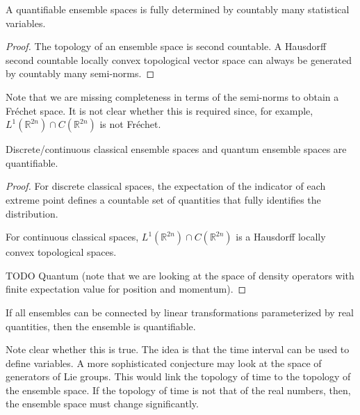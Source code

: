 \begin{coro}
	A quantifiable ensemble spaces is fully determined by countably many statistical variables.
\end{coro}

\begin{proof}
	The topology of an ensemble space is second countable. A Hausdorff second countable locally convex topological vector space can always be generated by countably many semi-norms.
\end{proof}

\begin{remark}
	Note that we are missing completeness in terms of the semi-norms to obtain a Fr\'echet space. It is not clear whether this is required since, for example, $L^1(\mathbb{R}^{2n}) \cap C(\mathbb{R}^{2n})$ is not Fr\'echet.
\end{remark}

\begin{conj}
	Discrete/continuous classical ensemble spaces and quantum ensemble spaces are quantifiable.
\end{conj}

\begin{proof}
	For discrete classical spaces, the expectation of the indicator of each extreme point defines a countable set of quantities that fully identifies the distribution.
	
	For continuous classical spaces, $L^1(\mathbb{R}^{2n}) \cap C(\mathbb{R}^{2n})$ is a Hausdorff locally convex topological spaces.
	
	TODO Quantum (note that we are looking at the space of density operators with finite expectation value for position and momentum).
\end{proof}

\begin{conj}
	If all ensembles can be connected by linear transformations parameterized by real quantities, then the ensemble is quantifiable.
\end{conj}

\begin{remark}
	Note clear whether this is true. The idea is that the time interval can be used to define variables. A more sophisticated conjecture may look at the space of generators of Lie groups. This would link the topology of time to the topology of the ensemble space. If the topology of time is not that of the real numbers, then, the ensemble space must change significantly.
\end{remark}

